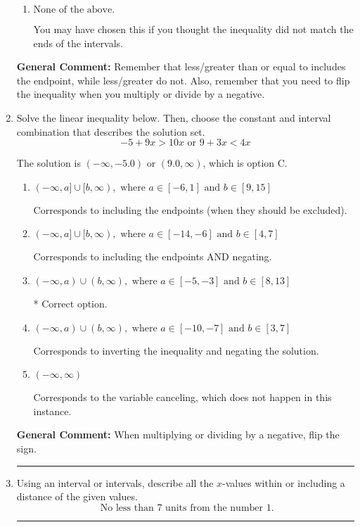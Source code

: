 \documentclass{extbook}[14pt]
\newcommand{\litem}[1]{\item #1

\rule{\textwidth}{0.4pt}}
\begin{document}
\begin{enumerate}
{\begin{enumerate}[label=\Alph*.]
 $[2.312, \infty)$, which corresponds to switching the direction of the interval AND negating the endpoint. You likely did this if you did not flip the inequality when dividing by a negative as well as not moving values over to a side properly.
\item \( \text{None of the above}. \)

You may have chosen this if you thought the inequality did not match the ends of the intervals.
\end{enumerate}

\textbf{General Comment:} Remember that less/greater than or equal to includes the endpoint, while less/greater do not. Also, remember that you need to flip the inequality when you multiply or divide by a negative.
}
\litem{
Solve the linear inequality below. Then, choose the constant and interval combination that describes the solution set.
\[ -5 + 9 x > 10 x \text{ or } 9 + 3 x < 4 x \]

The solution is \( (-\infty, -5.0) \text{ or } (9.0, \infty) \), which is option C.\begin{enumerate}[label=\Alph*.]
\item \( (-\infty, a] \cup [b, \infty), \text{ where } a \in [-6, 1] \text{ and } b \in [9, 15] \)

Corresponds to including the endpoints (when they should be excluded).
\item \( (-\infty, a] \cup [b, \infty), \text{ where } a \in [-14, -6] \text{ and } b \in [4, 7] \)

Corresponds to including the endpoints AND negating.
\item \( (-\infty, a) \cup (b, \infty), \text{ where } a \in [-5, -3] \text{ and } b \in [8, 13] \)

 * Correct option.
\item \( (-\infty, a) \cup (b, \infty), \text{ where } a \in [-10, -7] \text{ and } b \in [3, 7] \)

Corresponds to inverting the inequality and negating the solution.
\item \( (-\infty, \infty) \)

Corresponds to the variable canceling, which does not happen in this instance.
\end{enumerate}

\textbf{General Comment:} When multiplying or dividing by a negative, flip the sign.
}
\litem{
Using an interval or intervals, describe all the $x$-values within or including a distance of the given values.
\[ \text{ No less than } 7 \text{ units from the number } 1. \]

}
\end{enumerate}
\end{document}
